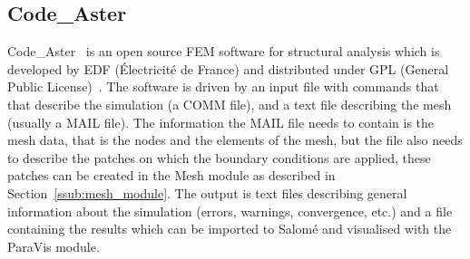 \subsection{Code\_Aster} %
\label{sub:code_aster}
Code\_Aster~\cite{codeaster} is an open source FEM software for structural analysis which is developed by EDF (Électricité de France) and distributed under GPL (General Public License)~\cite{gpl}. The software is driven by an input file with commands that that describe the simulation (a COMM file), and a text file describing the mesh (usually a MAIL file). The information the MAIL file needs to contain is the mesh data, that is the nodes and the elements of the mesh, but the file also needs to describe the patches on which the boundary conditions are applied, these patches can be created in the Mesh module as described in Section~\ref{ssub:mesh_module}. The output is text files describing general information about the simulation (errors, warnings, convergence, etc.) and a file containing the results which can be imported to Salomé and visualised with the ParaVis module. 

